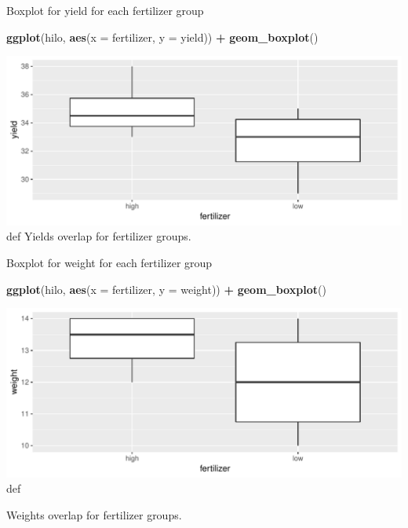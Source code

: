\documentclass[ignorenonframetext,]{beamer}
\newenvironment{Shaded}{\begin{snugshade}}{\end{snugshade}}
\newcommand{\DataTypeTok}[1]{\textcolor[rgb]{0.13,0.29,0.53}{#1}}
\newcommand{\KeywordTok}[1]{\textcolor[rgb]{0.13,0.29,0.53}{\textbf{#1}}}
\newcommand{\NormalTok}[1]{#1}
\newcommand{\OperatorTok}[1]{\textcolor[rgb]{0.81,0.36,0.00}{\textbf{#1}}}
\newcommand{\StringTok}[1]{\textcolor[rgb]{0.31,0.60,0.02}{#1}}
\begin{document}
\begin{frame}[fragile]{Boxplot for yield for each fertilizer group}
\protect\hypertarget{boxplot-for-yield-for-each-fertilizer-group}{}

\begin{Shaded}
\begin{Highlighting}[]
\KeywordTok{ggplot}\NormalTok{(hilo, }\KeywordTok{aes}\NormalTok{(}\DataTypeTok{x =}\NormalTok{ fertilizer, }\DataTypeTok{y =}\NormalTok{ yield)) }\OperatorTok{+}\StringTok{ }\KeywordTok{geom_boxplot}\NormalTok{()}
\end{Highlighting}
\end{Shaded}

\includegraphics{figure/ferto-1.pdf} def Yields overlap for fertilizer
groups.

\end{frame}

\begin{frame}[fragile]{Boxplot for weight for each fertilizer group}
\protect\hypertarget{boxplot-for-weight-for-each-fertilizer-group}{}

\begin{Shaded}
\begin{Highlighting}[]
\KeywordTok{ggplot}\NormalTok{(hilo, }\KeywordTok{aes}\NormalTok{(}\DataTypeTok{x =}\NormalTok{ fertilizer, }\DataTypeTok{y =}\NormalTok{ weight)) }\OperatorTok{+}\StringTok{ }\KeywordTok{geom_boxplot}\NormalTok{()}
\end{Highlighting}
\end{Shaded}

\includegraphics{figure/casteldisangro-1.pdf} def

Weights overlap for fertilizer groups.

\end{frame}
\end{document}
